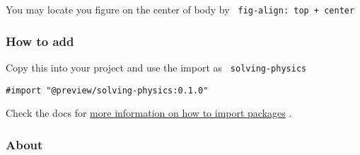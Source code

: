 \pandocbounded{}

You may locate you figure on the center of body by
\texttt{\ fig-align:\ top\ +\ center\ }

\begin{Shaded}
\begin{Highlighting}[]
\NormalTok{  given: [}
\NormalTok{  ],}
\NormalTok{  find: [}
\NormalTok{  ],}
\NormalTok{)[}
\NormalTok{]}
\end{Highlighting}
\end{Shaded}


\subsubsection{How to add}\label{how-to-add}

Copy this into your project and use the import as
\texttt{\ solving-physics\ }

\begin{verbatim}
#import "@preview/solving-physics:0.1.0"
\end{verbatim}



Check the docs for
\href{https://typst.app/docs/reference/scripting/\#packages}{more
information on how to import packages} .

\subsubsection{About}\label{about}

